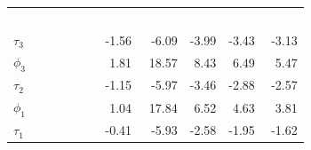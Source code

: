 \documentclass{article}
\begin{document}
    \begin{adjustbox}{width=\textwidth}
        \tiny %
            \begin{tabular}{lrrrrr}
                \rowcolor{mydarkblue}
                \textcolor{white}{Test Statistic}     & \textcolor{white}{$I(0)$}        & \textcolor{white}{$I(1)$}            & \textcolor{white}{1pct}           & \textcolor{white}{5pct}     & \textcolor{white}{10pct}                   \\
                $\tau_3$                              &-1.56                                  &-6.09                                      &-3.99                              &-3.43                        &-3.13                       \\
                $\phi_3$                              & 1.81                                  & 18.57                                     & 8.43                              & 6.49                        & 5.47                       \\
                $\tau_2$                              &-1.15                                  &-5.97                                      &-3.46                              &-2.88                        &-2.57                       \\
                $\phi_1$                              & 1.04                                  & 17.84                                     & 6.52                              & 4.63                        & 3.81                       \\
                $\tau_1$                              &-0.41                                  &-5.93                                      &-2.58                              &-1.95                        &-1.62                       \\
            \end{tabular}
            \hspace*{0.5cm}


\end{adjustbox}
\end{document}
